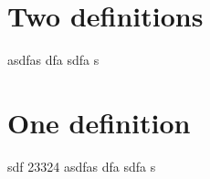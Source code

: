 \documentclass{report}
\newcommand{\ExampleList}{
  \hypertarget{listOfExamples}{}
  \listofExampleMacro
}
\begin{document}
\section{Two definitions}

\begin{example}[12312]
  asdfas dfa sdfa s
\end{example}

\section{One definition}


\begin{example}{sdf 23324}
  asdfas dfa sdfa s
\end{example}

\ExampleList
\end{document}
